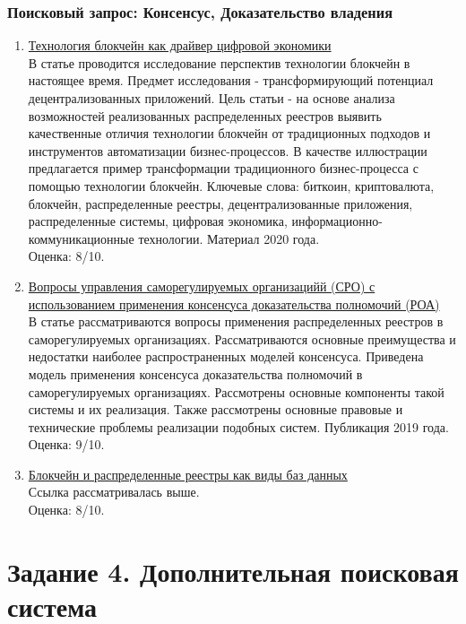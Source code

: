 \documentclass[a4paper, 12pt]{report}		%
\begin{document}
\subsection*{Поисковый запрос: Консенсус, Доказательство владения}

\begin{enumerate}
\item \href{https://elibrary.ru/item.asp?id=44236813}{Технология блокчейн как драйвер цифровой экономики}\\
В статье проводится исследование перспектив технологии блокчейн в настоящее время. Предмет исследования - трансформирующий потенциал децентрализованных приложений. Цель статьи - на основе анализа возможностей реализованных распределенных реестров выявить качественные отличия технологии блокчейн от традиционных подходов и инструментов автоматизации бизнес-процессов. В качестве иллюстрации предлагается пример трансформации традиционного бизнес-процесса с помощью технологии блокчейн. Ключевые слова: биткоин, криптовалюта, блокчейн, распределенные реестры, децентрализованные приложения, распределенные системы, цифровая экономика, информационно-коммуникационные технологии. Материал 2020 года.\\
Оценка: 8/10.
\item \href{https://elibrary.ru/item.asp?id=38568047}{Вопросы управления саморегулируемых организацийй (СРО) с использованием применения консенсуса доказательства полномочий (РОА)}\\
В статье рассматриваются вопросы применения распределенных реестров в саморегулируемых организациях. Рассматриваются основные преимущества и недостатки наиболее распространенных моделей консенсуса. Приведена модель применения консенсуса доказательства полномочий в саморегулируемых организациях. Рассмотрены основные компоненты такой системы и их реализация. Также рассмотрены основные правовые и технические проблемы реализации подобных систем. Публикация 2019 года.\\
Оценка: 9/10.
\item \href{https://cyberleninka.ru/article/n/blokcheyn-i-raspredelennye-reestry-kak-vidy-baz-dannyh}{Блокчейн и распределенные реестры как виды баз данных}\\
Ссылка рассматривалась выше.\\
Оценка: 8/10.
\end{enumerate}


\chapter*{Задание 4. Дополнительная поисковая система}
\end{document}
